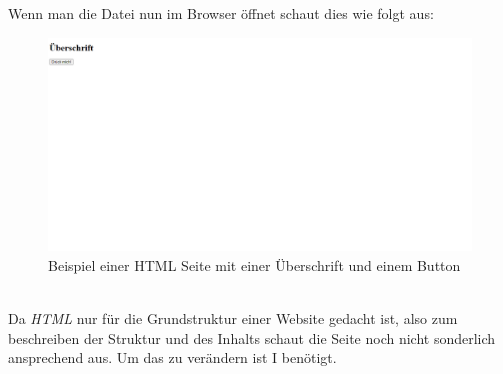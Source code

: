 		Wenn man die Datei nun im Browser öffnet schaut dies wie folgt aus:
		\begin{figure}[H]
			\centering
			\includegraphics[width=1\linewidth]{images/html1}
			\caption[HTML Beispielseite]{Beispiel einer HTML Seite mit einer Überschrift und einem Button}
			\label{fig:htmlbsp}
		\end{figure}
		~\\
		Da \textit{HTML} nur für die Grundstruktur einer Website gedacht ist, also zum beschreiben der Struktur und des Inhalts schaut die Seite noch nicht sonderlich ansprechend aus. Um das zu verändern ist I benötigt.
		\cite{auszeichnungssprachen}
		\cite{html5-css3-handbuch}
		\cite{html5-css3-def}
